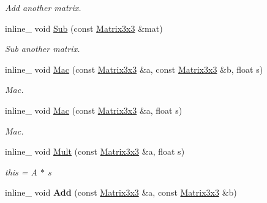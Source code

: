 \begin{DoxyCompactItemize}
\begin{DoxyCompactList}\small\item\em Add another matrix. \end{DoxyCompactList}\item 
inline\+\_\+ void \hyperlink{classOpcode_1_1Matrix3x3_acc6430711ff222fa2ed90e99aaa6d042}{Sub} (const \hyperlink{classOpcode_1_1Matrix3x3}{Matrix3x3} \&mat)\hypertarget{classOpcode_1_1Matrix3x3_acc6430711ff222fa2ed90e99aaa6d042}{}\label{classOpcode_1_1Matrix3x3_acc6430711ff222fa2ed90e99aaa6d042}

\begin{DoxyCompactList}\small\item\em Sub another matrix. \end{DoxyCompactList}\item 
inline\+\_\+ void \hyperlink{classOpcode_1_1Matrix3x3_a2c0d6d0f8f60a617da339e2a069134e0}{Mac} (const \hyperlink{classOpcode_1_1Matrix3x3}{Matrix3x3} \&a, const \hyperlink{classOpcode_1_1Matrix3x3}{Matrix3x3} \&b, float s)\hypertarget{classOpcode_1_1Matrix3x3_a2c0d6d0f8f60a617da339e2a069134e0}{}\label{classOpcode_1_1Matrix3x3_a2c0d6d0f8f60a617da339e2a069134e0}

\begin{DoxyCompactList}\small\item\em Mac. \end{DoxyCompactList}\item 
inline\+\_\+ void \hyperlink{classOpcode_1_1Matrix3x3_acbfb5af4a8c03adf5ce4f241c13f3308}{Mac} (const \hyperlink{classOpcode_1_1Matrix3x3}{Matrix3x3} \&a, float s)\hypertarget{classOpcode_1_1Matrix3x3_acbfb5af4a8c03adf5ce4f241c13f3308}{}\label{classOpcode_1_1Matrix3x3_acbfb5af4a8c03adf5ce4f241c13f3308}

\begin{DoxyCompactList}\small\item\em Mac. \end{DoxyCompactList}\item 
inline\+\_\+ void \hyperlink{classOpcode_1_1Matrix3x3_a8f1e6a033324867f2f616077af919d07}{Mult} (const \hyperlink{classOpcode_1_1Matrix3x3}{Matrix3x3} \&a, float s)\hypertarget{classOpcode_1_1Matrix3x3_a8f1e6a033324867f2f616077af919d07}{}\label{classOpcode_1_1Matrix3x3_a8f1e6a033324867f2f616077af919d07}

\begin{DoxyCompactList}\small\item\em this = A $\ast$ s \end{DoxyCompactList}\item 
inline\+\_\+ void {\bfseries Add} (const \hyperlink{classOpcode_1_1Matrix3x3}{Matrix3x3} \&a, const \hyperlink{classOpcode_1_1Matrix3x3}{Matrix3x3} \&b)\hypertarget{classOpcode_1_1Matrix3x3_a796a2655371f3c39d6e181c49aa0c6af}{}\label{classOpcode_1_1Matrix3x3_a796a2655371f3c39d6e181c49aa0c6af}


\end{DoxyCompactItemize}
